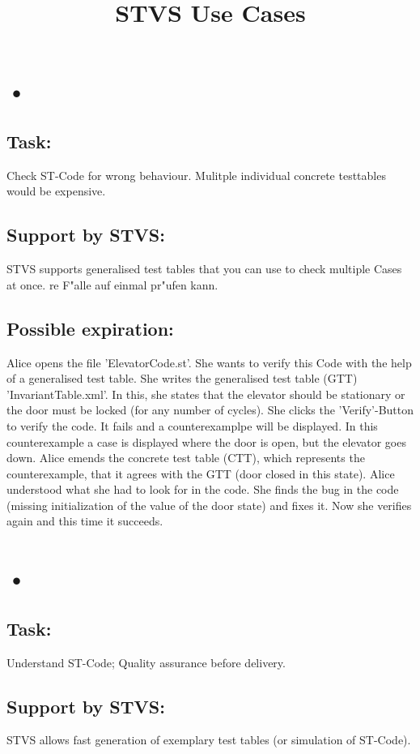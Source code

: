 \documentclass[10pt]{article}
\begin{document}
\title{STVS Use Cases}
\maketitle
\section{•}
\subsection{Task:}
Check ST-Code for wrong behaviour. Mulitple individual concrete testtables would be expensive.
\subsection{Support by STVS:}
STVS supports generalised test tables that you can use to check multiple Cases at once.
re F"alle auf einmal pr"ufen kann.
\subsection{Possible expiration:}
Alice opens the file 'ElevatorCode.st'. She wants to verify this Code with the help of a generalised test table. She writes the generalised test table (GTT) 'InvariantTable.xml'. In this, she states that the elevator should be stationary or the door must be locked (for any number of cycles). She clicks the 'Verify'-Button to verify the code. It fails and a counterexamplpe will be displayed. In this counterexample a case is displayed where the door is open, but the elevator goes down. Alice emends the concrete test table (CTT), which represents the counterexample, that it agrees with the GTT (door closed in this state). Alice understood what she had to look for in the code. She finds the bug in the code (missing initialization of the value of the door state) and fixes it. Now she verifies again and this time it succeeds.
\section{•}
\subsection{Task:}
Understand ST-Code; Quality assurance before delivery.
\subsection{Support by STVS:}
STVS allows fast generation of exemplary test tables (or simulation of ST-Code).
\end{document}

